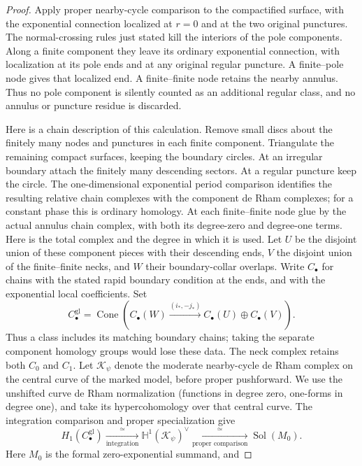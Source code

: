 \begin{proof}
Apply proper nearby-cycle comparison to the compactified surface,
with the exponential connection localized at $r=0$ and at the two
original punctures. The normal-crossing rules just stated kill the
interiors of the pole components. Along a finite component they leave
its ordinary exponential connection, with localization at its pole
ends and at any original regular puncture. A finite--pole node gives
that localized end. A finite--finite node retains the nearby annulus.
Thus no pole component is silently counted as an additional regular
class, and no annulus or puncture residue is discarded.

Here is a chain description of this calculation. Remove small discs
about the finitely many nodes and punctures in each finite component.
Triangulate the remaining compact surfaces, keeping the boundary
circles. At an irregular boundary attach the finitely many descending
sectors. At a regular puncture keep the circle. The one-dimensional
exponential period comparison identifies the resulting relative
chain complexes with the component de Rham complexes; for a constant
phase this is ordinary homology. At each finite--finite node glue by
the actual annulus chain complex, with both its degree-zero and
degree-one terms. Here is the total complex and the degree in which it is used. Let
$U$ be the disjoint union of these component pieces with their descending
ends, $V$ the disjoint union of the finite--finite necks, and $W$ their
boundary-collar overlaps. Write $C_\bullet$ for chains with the stated
rapid boundary condition at the ends, and with the exponential local
coefficients. Set
\[
 C^{\mathrm{gl}}_\bullet=
 \operatorname{Cone}\!\left(
 C_\bullet(W)\xrightarrow{(i_*,-j_*)}
 C_\bullet(U)\oplus C_\bullet(V)\right).
\]
Thus a class includes its matching boundary chains; taking the separate
component homology groups would lose these data. The neck complex
retains both $C_0$ and $C_1$. Let $\mathcal K_\psi$ denote the moderate
nearby-cycle de Rham complex on the central curve of the marked model,
before proper pushforward. We use the unshifted curve de Rham
normalization (functions in degree zero, one-forms in degree one),
and take its hypercohomology over that central curve. The integration
comparison and proper specialization give
\[
 H_1(C^{\mathrm{gl}}_\bullet)
 \xrightarrow[\text{integration}]{\ \simeq\ }
 \mathbb H^1(\mathcal K_\psi)^\vee
 \xrightarrow[\text{proper comparison}]{\ \simeq\ }
 \operatorname{Sol}(M_0).
\]
Here $M_0$ is the formal zero-exponential summand, and

\end{proof}
